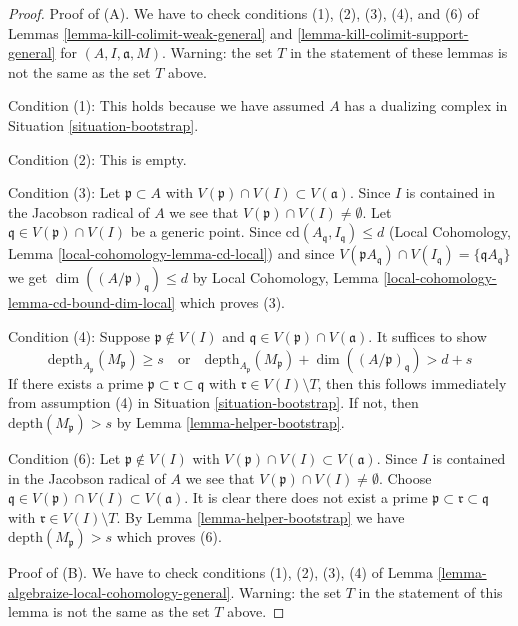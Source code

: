 \documentclass{stacks-project}
\theoremstyle{plain}
\theoremstyle{definition}
\theoremstyle{remark}
\numberwithin{equation}{subsection}
\begin{document}
\begin{proof}
\medskip\noindent
Proof of (A). We have to check conditions (1), (2), (3), (4), and (6)
of Lemmas \ref{lemma-kill-colimit-weak-general} and
\ref{lemma-kill-colimit-support-general} for
$(A, I, \mathfrak a, M)$. Warning: the set $T$ in the statement of
these lemmas is not the same as the set $T$ above.

\medskip\noindent
Condition (1): This holds because we have assumed $A$ has a dualizing complex in
Situation \ref{situation-bootstrap}.

\medskip\noindent
Condition (2): This is empty.

\medskip\noindent
Condition (3): Let $\mathfrak p \subset A$ with
$V(\mathfrak p) \cap V(I) \subset V(\mathfrak a)$.
Since $I$ is contained in the Jacobson radical of $A$ we see
that $V(\mathfrak p) \cap V(I) \not = \emptyset$.
Let $\mathfrak q \in V(\mathfrak p) \cap V(I)$ be a generic point.
Since $\text{cd}(A_\mathfrak q, I_\mathfrak q) \leq d$
(Local Cohomology, Lemma \ref{local-cohomology-lemma-cd-local}) and since
$V(\mathfrak p A_\mathfrak q) \cap V(I_\mathfrak q) =
\{\mathfrak q A_\mathfrak q\}$ we get
$\dim((A/\mathfrak p)_\mathfrak q) \leq d$ by Local Cohomology,
Lemma \ref{local-cohomology-lemma-cd-bound-dim-local} which proves (3).

\medskip\noindent
Condition (4): Suppose $\mathfrak p \not \in V(I)$ and
$\mathfrak q \in V(\mathfrak p) \cap V(\mathfrak a)$.
It suffices to show
$$
\text{depth}_{A_\mathfrak p}(M_\mathfrak p) \geq s
\quad\text{or}\quad
\text{depth}_{A_\mathfrak p}(M_\mathfrak p) +
\dim((A/\mathfrak p)_\mathfrak q) > d + s
$$
If there exists a prime $\mathfrak p \subset \mathfrak r \subset \mathfrak q$
with $\mathfrak r \in V(I) \setminus T$, then this follows
immediately from assumption (4) in Situation \ref{situation-bootstrap}.
If not, then $\text{depth}(M_\mathfrak p) > s$ by
Lemma \ref{lemma-helper-bootstrap}.

\medskip\noindent
Condition (6): Let $\mathfrak p \not \in V(I)$ with
$V(\mathfrak p) \cap V(I) \subset V(\mathfrak a)$.
Since $I$ is contained in the Jacobson radical of $A$ we see
that $V(\mathfrak p) \cap V(I) \not = \emptyset$.
Choose $\mathfrak q \in V(\mathfrak p) \cap V(I) \subset V(\mathfrak a)$.
It is clear there does not exist a prime
$\mathfrak p \subset \mathfrak r \subset \mathfrak q$
with $\mathfrak r \in V(I) \setminus T$.
By Lemma \ref{lemma-helper-bootstrap} we have
$\text{depth}(M_\mathfrak p) > s$ which proves (6).

\medskip\noindent
Proof of (B). We have to check conditions (1), (2), (3), (4) of
Lemma \ref{lemma-algebraize-local-cohomology-general}. Warning:
the set $T$ in the statement of
this lemma is not the same as the set $T$ above.


\end{proof}
\end{document}

